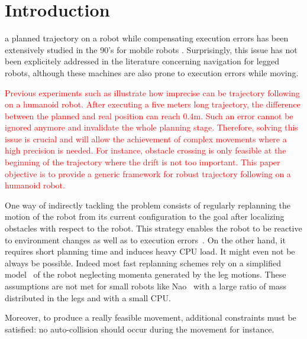 \section{Introduction}

 a planned trajectory on a robot while
compensating execution errors has been extensively studied in the 90's
for mobile robots \cite{91icra.samson,
  98deLucaOrioloSamson}. Surprisingly, this issue has not been
explicitely addressed in the literature concerning navigation for
legged robots, although these machines are also prone to execution
errors while moving.

\textcolor{red}{Previous experiments such as
  \cite{11humanoids.baudouin} illustrate how imprecise can be
  trajectory following on a humanoid robot. After executing a five
  meters long trajectory, the difference between the planned and real
  position can reach $0.4 \textrm{m}$. Such an error cannot be ignored
  anymore and invalidate the whole planning stage. Therefore, solving
  this issue is crucial and will allow the achievement of complex
  movements where a high precision is needed. For instance, obstacle
  crossing is only feasible at the beginning of the trajectory where
  the drift is not too important. This paper objective is to provide a
  generic framework for robust trajectory following on a humanoid
  robot.  }

One way of indirectly tackling the problem consists of regularly
replanning the motion of the robot from its current configuration to
the goal after localizing obstacles with respect to the robot. This
strategy enables the robot to be reactive to environment changes as
well as to execution errors~\cite{05humanoids.michel,
  06icra.MichelChestnut,10springer.chestnut}. On the other hand, it
requires short planning time and induces heavy CPU load. It might even
not be always be possible. Indeed most fast replanning schemes rely on
a simplified model~\cite{01icra.KajitaKanehiro} of the robot
neglecting momenta generated by the leg motions. These assumptions are
not met for small robots like Nao~\cite{wikipedia.nao} with a large
ratio of mass distributed in the legs and with a small CPU.

Moreover, to produce a really feasible movement, additional
constraints must be satisfied: no auto-collision should occur during
the movement for instance.


